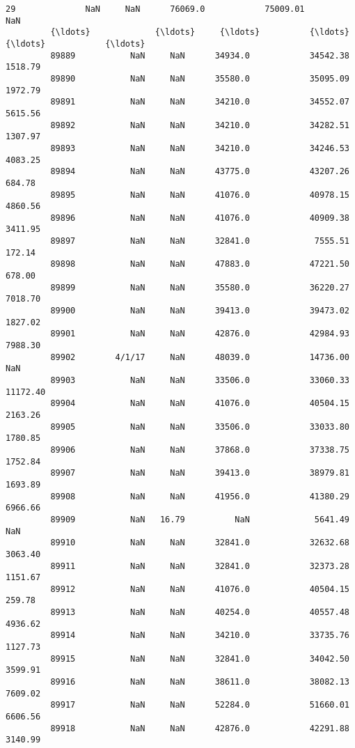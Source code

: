 \documentclass[11pt]{article}
\begin{document}
\begin{Verbatim}[commandchars=\\\{\}]
         29              NaN     NaN      76069.0            75009.01            NaN   
         {\ldots}             {\ldots}     {\ldots}          {\ldots}                 {\ldots}            {\ldots}   
         89889           NaN     NaN      34934.0            34542.38        1518.79   
         89890           NaN     NaN      35580.0            35095.09        1972.79   
         89891           NaN     NaN      34210.0            34552.07        5615.56   
         89892           NaN     NaN      34210.0            34282.51        1307.97   
         89893           NaN     NaN      34210.0            34246.53        4083.25   
         89894           NaN     NaN      43775.0            43207.26         684.78   
         89895           NaN     NaN      41076.0            40978.15        4860.56   
         89896           NaN     NaN      41076.0            40909.38        3411.95   
         89897           NaN     NaN      32841.0             7555.51         172.14   
         89898           NaN     NaN      47883.0            47221.50         678.00   
         89899           NaN     NaN      35580.0            36220.27        7018.70   
         89900           NaN     NaN      39413.0            39473.02        1827.02   
         89901           NaN     NaN      42876.0            42984.93        7988.30   
         89902        4/1/17     NaN      48039.0            14736.00            NaN   
         89903           NaN     NaN      33506.0            33060.33       11172.40   
         89904           NaN     NaN      41076.0            40504.15        2163.26   
         89905           NaN     NaN      33506.0            33033.80        1780.85   
         89906           NaN     NaN      37868.0            37338.75        1752.84   
         89907           NaN     NaN      39413.0            38979.81        1693.89   
         89908           NaN     NaN      41956.0            41380.29        6966.66   
         89909           NaN   16.79          NaN             5641.49            NaN   
         89910           NaN     NaN      32841.0            32632.68        3063.40   
         89911           NaN     NaN      32841.0            32373.28        1151.67   
         89912           NaN     NaN      41076.0            40504.15         259.78   
         89913           NaN     NaN      40254.0            40557.48        4936.62   
         89914           NaN     NaN      34210.0            33735.76        1127.73   
         89915           NaN     NaN      32841.0            34042.50        3599.91   
         89916           NaN     NaN      38611.0            38082.13        7609.02   
         89917           NaN     NaN      52284.0            51660.01        6606.56   
         89918           NaN     NaN      42876.0            42291.88        3140.99   
         

\end{Verbatim}
\end{document}
